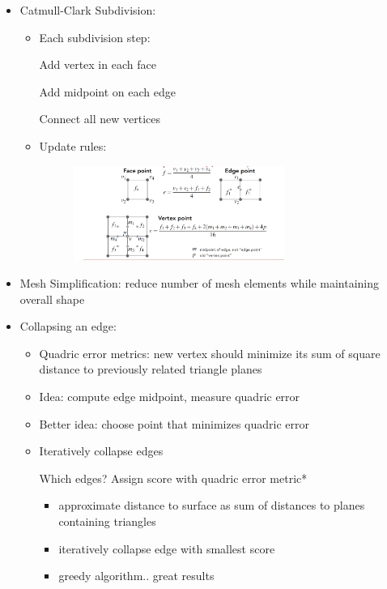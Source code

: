 \documentclass{article}
\begin{document}
\begin{itemize}
\begin{itemize}
    \end{itemize}
    
    \item Catmull-Clark Subdivision:
    \begin{itemize}
        \item Each subdivision step:
        
        Add vertex in each face
        
        Add midpoint on each edge
        
        Connect all new vertices
        
        \item Update rules:
        \begin{figure}[H]
        \centering
        \includegraphics[width=0.7\textwidth]{imgs/cc_subdivide.jpeg}
    \end{figure}
    \end{itemize}
    
    \item Mesh Simplification: reduce number of mesh elements while maintaining overall shape
    
    \item Collapsing an edge:
    \begin{itemize}
        \item Quadric error metrics: new vertex should minimize its sum of square distance to previously related triangle planes
        
        \item Idea: compute edge midpoint, measure quadric error
        
        \item Better idea: choose point that minimizes quadric error
        \item Iteratively collapse edges 
        
        Which edges? Assign score with quadric error metric* 
        \begin{itemize}
            \item 
        
        approximate distance to surface as sum of distances to planes containing triangles 
        \item
        iteratively collapse edge with smallest score 
        \item
        greedy algorithm.. great results
        \end{itemize}
    \end{itemize}
    
    
\end{itemize}
\end{document}

